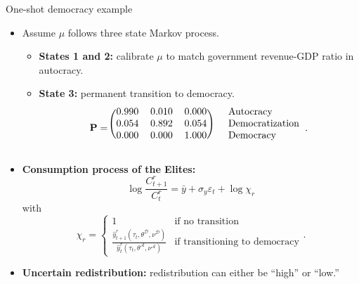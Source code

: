 \begin{frame}{One-shot democracy example}
	\begin{itemize}
		\item<1-> Assume $\mu$ follows three state Markov process.
		\vspace{.10cm}
		\begin{itemize}
			\item<1->[--] \textbf{States 1 and 2:} calibrate $\mu$ to match government revenue-GDP ratio in autocracy.
			\vspace{.10cm}
			\item<1->[--] \textbf{State 3:} permanent transition to democracy.
			\begin{equation*}
			\mathbf{P}=\begin{blockarray}{cccc}
			\begin{block}{(ccc)l}
 			 0.990 & 0.010  & 0.000 & \quad \textrm{Autocracy} \\
  			 \transPTwoOne & \transPTwoTwo & \transPTwoThree  & \quad \textrm{Democratization} \\
  			 0.000 & 0.000 & 1.000 &  \quad \textrm{Democracy} \\
			\end{block}
			\end{blockarray}.
		\end{equation*}
		\end{itemize}
		\vspace*{-.85cm}
	\item<2-> \textbf{Consumption process of the Elites:}
	\begin{equation*}
		\log \frac{C^r_{t+1}}{C^r_{t}} = \bar{y}+\sigma_y\varepsilon_{t} + \log \chi_{r}
	\end{equation*}
	with 
	\begin{equation*}
		\chi_{r}=\begin{cases}
			1 & \text{if no transition} \\
			\frac{\hat{y}_{t+1}^{r} (\tau_{t},\theta^{\mathcal{D}},\nu^{\mathcal{D}})}{\hat{y}_{t}^{r}(\tau_{t},\theta^{\mathcal{A}},\nu^{\mathcal{A}})} & \textrm{if transitioning to democracy}
		\end{cases}.
	\end{equation*}
	\vspace{.10cm}
	\item<3-> \textbf{Uncertain redistribution:} redistribution can either be ``high'' or ``low.''
	\end{itemize}
		
\end{frame}

